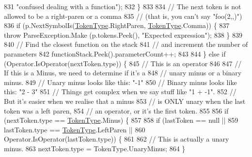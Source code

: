\begin{DoxyCode}
831                                 \textcolor{stringliteral}{"confused dealing with a function"});
832                         \}
833 
834                         \textcolor{comment}{// The next token is not allowed to be a right-paren or a comma}
835                         \textcolor{comment}{// (that is, you can't say "foo(2,,)")}
836                         \textcolor{keywordflow}{if} (p.NextSymbolIs(\hyperlink{a00040_a301aa7c866593a5b625a8fc158bbeace}{TokenType}.RightParen, 
      \hyperlink{a00040_a301aa7c866593a5b625a8fc158bbeace}{TokenType}.Comma)) \{
837                             \textcolor{keywordflow}{throw} ParseException.Make (p.tokens.Peek(), \textcolor{stringliteral}{"Expected expression"});
838                         \}
839 
840                         \textcolor{comment}{// Find the closest function on the stack}
841                         \textcolor{comment}{// and increment the number of parameters}
842                         functionStack.Peek().parameterCount++;
843 
844                     \} \textcolor{keywordflow}{else} \textcolor{keywordflow}{if} (Operator.IsOperator(nextToken.type)) \{
845                         \textcolor{comment}{// This is an operator}
846 
847                         \textcolor{comment}{// If this is a Minus, we need to determine if it's a }
848                         \textcolor{comment}{// unary minus or a binary minus.}
849                         \textcolor{comment}{// Unary minus looks like this: "-1"}
850                         \textcolor{comment}{// Binary minus looks like this: "2 - 3"}
851                         \textcolor{comment}{// Things get complex when we say stuff like "1 + -1".}
852                         \textcolor{comment}{// But it's easier when we realise that a minus}
853                         \textcolor{comment}{// is ONLY unary when the last token was a left paren,}
854                         \textcolor{comment}{// an operator, or it's the first token.}
855 
856                         \textcolor{keywordflow}{if} (nextToken.type == \hyperlink{a00040_a301aa7c866593a5b625a8fc158bbeace}{TokenType}.Minus) \{
857 
858                             \textcolor{keywordflow}{if} (lastToken == null || 
859                                 lastToken.type == \hyperlink{a00040_a301aa7c866593a5b625a8fc158bbeace}{TokenType}.LeftParen ||
860                                 Operator.IsOperator(lastToken.type)) \{
861 
862                                 \textcolor{comment}{// This is actually a unary minus.}
863                                 nextToken.type = TokenType.UnaryMinus;
864                             \}

\end{DoxyCode}
